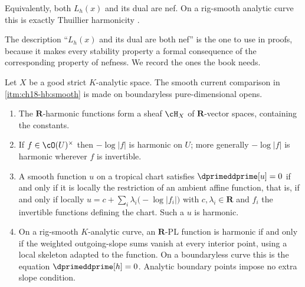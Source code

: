 Equivalently, both $L_h(x)$ and its dual are nef.  On a rig-smooth analytic
curve this is exactly Thuillier harmonicity
\cite[Proposition~15.7]{GJR26}.

The description ``$L_h(x)$ and its dual are both nef'' is the one to use in
proofs, because it makes every stability property a formal consequence of
the corresponding property of nefness.  We record the ones the book needs.

\begin{proposition}
\label{prop:ch18-harmonic-basic}
Let $X$ be a good strict $K$-analytic space.  The smooth current comparison
in \cref{itm:ch18-hb:smooth} is made on boundaryless pure-dimensional opens.
\begin{enumerate}
\item\label{itm:ch18-hb:sheaf}
 The $\mathbf R$-harmonic functions form a sheaf $\cH_X$ of
 $\mathbf R$-vector spaces, containing the constants.
\item\label{itm:ch18-hb:units}
 If $f\in\cO(U)^\times$ then $-\log|f|$ is harmonic on $U$; more generally
 $-\log|f|$ is harmonic wherever $f$ is invertible.
\item\label{itm:ch18-hb:smooth}
 A smooth function $u$ on a tropical chart satisfies $\dprimeddprime[u]=0$
 if and only if it is locally the restriction of an ambient affine function,
 that is, if and only if locally
 $u=c+\sum_i\lambda_i\bigl(-\log|f_i|\bigr)$ with $c,\lambda_i\in\mathbf R$
 and $f_i$ the invertible functions defining the chart.  Such a $u$ is
 harmonic.
\item\label{itm:ch18-hb:curve}
 On a rig-smooth $K$-analytic curve, an $\mathbf R$-PL function is harmonic
 if and only if the weighted outgoing-slope sums vanish at every interior
 point, using a local skeleton adapted to the function.  On a boundaryless
 curve this is the equation $\dprimeddprime[h]=0$.  Analytic boundary
 points impose no extra slope condition.
\end{enumerate}
\end{proposition}


